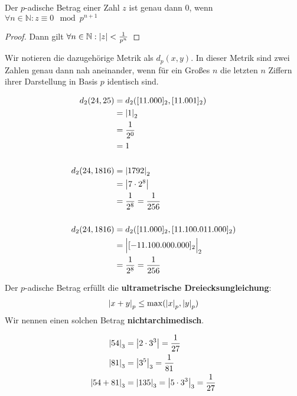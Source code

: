 \documentclass{report}
\newcommand*{\newpar}{\par\vspace{\baselineskip}\noindent}
\newcommand{\tbf}[1]{\textbf{#1}}
\newcommand{\bN}{\mathbb{N}}
\begin{document}
	\begin{corollary}
		Der $p$-adische Betrag einer Zahl $z$ ist genau dann $0$, wenn $\forall n \in \bN : z \equiv 0 \mod p^{n+1}$ 
	\end{corollary}
	\begin{proof}
		Dann gilt $\forall n \in \bN : \abs{z} < \frac{1}{p^n}$
	\end{proof}
	\newpar
	Wir notieren die dazugehörige Metrik als $d_p(x,y)$. In dieser Metrik sind zwei Zahlen genau dann nah aneinander, wenn für ein Großes $n$ die letzten $n$ Ziffern ihrer Darstellung in Basis $p$ identisch sind.
	\begin{example}
		\begin{align*}
			d_2(24, 25) &= d_2([11.000]_2,[11.001]_2)\\
			 			&= \abs{1}_2\\ 
			 			&= \frac{1}{2^0}\\ 
			 			&= 1\\\\
			d_2(24, 1816) &= \abs{1792}_2\\ 
						  &= \abs{7 \cdot 2^8}\\
						  &= \frac{1}{2^8} = \frac{1}{256}\\\\
			d_2(24, 1816) &= d_2([11.000]_2, [11.100.011.000]_2)\\
						  &= \Big|[-11.100.000.000]_2\Big|_2\\
						  &= \frac{1}{2^8} = \frac{1}{256}\\
		\end{align*}
	\end{example}
	\begin{theorem}
		Der $p$-adische Betrag erfüllt die \tbf{ultrametrische Dreiecksungleichung}:
		\begin{align*}
			\abs{x + y}_p \leq \max(\abs{x}_p,  \abs{y}_p)
		\end{align*}
		Wir nennen einen solchen Betrag \tbf{nichtarchimedisch}.
	\end{theorem}
	\begin{example}
		\begin{align*}
			\abs{54}_3 &= \abs{2 \cdot 3^3} = \frac{1}{27}\\
			\abs{81}_3 &= \abs{3^5}_3 = \frac{1}{81}\\
			\abs{54 + 81}_3 &= \abs{135}_3 = \abs{5 \cdot 3^3}_3 = \frac{1}{27}
		\end{align*}
	\end{example}
\end{document}
